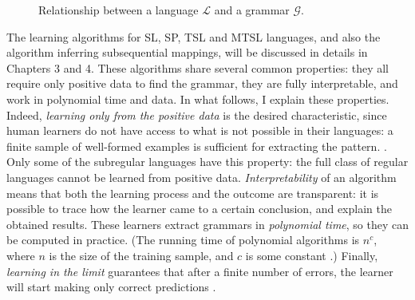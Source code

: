 \begin{figure}[t]
  \centering
  \caption{Relationship between a language $\mathcal{L}$ and a grammar $\mathcal{G}$.}
  \label{fig:LGrel}
\end{figure}


The learning algorithms for SL, SP, TSL and MTSL languages, and also the algorithm inferring subsequential mappings, will be discussed in details in Chapters 3 and 4.
These algorithms share several common properties: they all require only positive data to find the grammar, they are fully interpretable, and work in polynomial time and data.
In what follows, I explain these properties.
Indeed, \emph{learning only from the positive data} is the desired characteristic, since human learners do not have access to what is not possible in their languages: a finite sample of well-formed examples is sufficient for extracting the pattern. \citep{Chomsky1986}.
Only some of the subregular languages have this property: the full class of regular languages cannot be learned from positive data.
\emph{Interpretability} of an algorithm means that both the learning process and the outcome are transparent: it is possible to trace how the learner came to a certain conclusion, and explain the obtained results.
These learners extract grammars in \emph{polynomial time}, so they can be computed in practice.
(The running time of polynomial algorithms is $n^c$, where $n$ is the size of the training sample, and $c$ is some constant \citep{Sipser2013}.)
Finally, \emph{learning in the limit} guarantees that after a finite number of errors, the learner will start making only correct predictions \citep{Gold1967}. 

